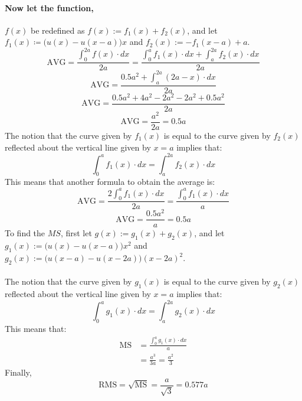 \documentclass{article}
\begin{document}
	\paragraph[Relation3]{Now let the function,} $f(x)$ be redefined as 
	$f(x):=f_1(x)+f_2(x)$, and let $f_1(x)\coloneqq\big(u(x)-u(x-a)\big)x$ and
	$f_2(x):=-f_1(x-a) + a$.
	$$ \text{AVG}=\frac{\int_{0}^{2a}f(x)\cdot dx}{2a} = 
	\frac{\int_{0}^{a}f_1(x)\cdot dx + \int_{a}^{2a}f_2(x) \cdot dx}{2a}$$
	$$ \text{AVG} = \frac{0.5a^2 + \int_{a}^{2a}(2a-x) \cdot dx}{2a}$$
	$$ \text{AVG} = \frac{0.5a^2 + 4a^2 - 2a^2 - 2a^2 + 0.5a^2}{2a}$$
	$$ \text{AVG} = \frac{a^2}{2a} = 0.5a$$
	The notion that the curve given by $f_1(x)$ is equal to the curve given by 
	$f_2(x)$ reflected about the vertical line given by $x=a$ implies that:
	$$ \int_{0}^{a}f_1(x) \cdot dx = \int_{a}^{2a}f_2(x)\cdot dx$$
	This means that another formula to obtain the average is:
	$$ \text{AVG} = \frac{2\int_{0}^{a}f_1(x) \cdot dx}{2a} = 
	\frac{\int_{0}^{a}f_1(x) \cdot dx}{a}$$
	$$ \text{AVG} = \frac{0.5a^2}{a} = 0.5a$$
	To find the $MS$, first let $g(x):=g_1(x)+g_2(x)$, and let 
	$g_1(x):=\big(u(x)-u(x-a)\big)x^2$ and 
	$g_2(x):=\big(u(x-a) - u(x-2a)\big)(x-2a)^2$. \\ \\
	The notion that the curve given by $g_1(x)$ is equal to the curve given by 
	$g_2(x)$ reflected about the vertical line given by $x=a$ implies that:
	$$ \int_{0}^{a}g_1(x) \cdot dx = \int_{a}^{2a}g_2(x)\cdot dx$$
	This means that:
	\begin{align*}
		\text{MS}&=\frac{\int_{0}^{a}g_1(x)\cdot dx}{a} \\
		 &= \frac{a^3}{3a} = \frac{a^2}{3}
	\end{align*}
	Finally,
	$$ \text{RMS} = \sqrt{\text{MS}} = \frac{a}{\sqrt{3}} = 0.577a$$
\end{document}
